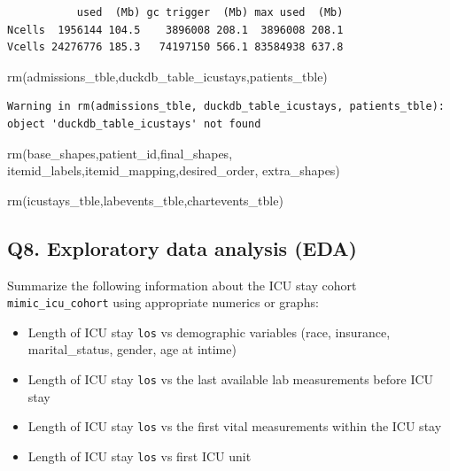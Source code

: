 \documentclass[
]{article}
\newenvironment{Shaded}{\begin{snugshade}}{\end{snugshade}}
\newcommand{\FunctionTok}[1]{\textcolor[rgb]{0.00,0.00,0.00}{#1}}
\newcommand{\NormalTok}[1]{\textcolor[rgb]{0.00,0.00,0.00}{#1}}
\begin{document}
\begin{verbatim}
           used  (Mb) gc trigger  (Mb) max used  (Mb)
Ncells  1956144 104.5    3896008 208.1  3896008 208.1
Vcells 24276776 185.3   74197150 566.1 83584938 637.8
\end{verbatim}

\begin{Shaded}
\begin{Highlighting}[]
\FunctionTok{rm}\NormalTok{(admissions\_tble,duckdb\_table\_icustays,patients\_tble)}
\end{Highlighting}
\end{Shaded}

\begin{verbatim}
Warning in rm(admissions_tble, duckdb_table_icustays, patients_tble): object 'duckdb_table_icustays' not found
\end{verbatim}

\begin{Shaded}
\begin{Highlighting}[]
\FunctionTok{rm}\NormalTok{(base\_shapes,patient\_id,final\_shapes,}
\NormalTok{   itemid\_labels,itemid\_mapping,desired\_order,}
\NormalTok{   extra\_shapes)}

\FunctionTok{rm}\NormalTok{(icustays\_tble,labevents\_tble,chartevents\_tble)}
\end{Highlighting}
\end{Shaded}

\hypertarget{q8.-exploratory-data-analysis-eda}{%
\subsection{Q8. Exploratory data analysis
(EDA)}\label{q8.-exploratory-data-analysis-eda}}

Summarize the following information about the ICU stay cohort
\texttt{mimic\_icu\_cohort} using appropriate numerics or graphs:

\begin{itemize}
\item
  Length of ICU stay \texttt{los} vs demographic variables (race,
  insurance, marital\_status, gender, age at intime)
\item
  Length of ICU stay \texttt{los} vs the last available lab measurements
  before ICU stay
\item
  Length of ICU stay \texttt{los} vs the first vital measurements within
  the ICU stay
\item
  Length of ICU stay \texttt{los} vs first ICU unit
\end{itemize}
\end{document}
